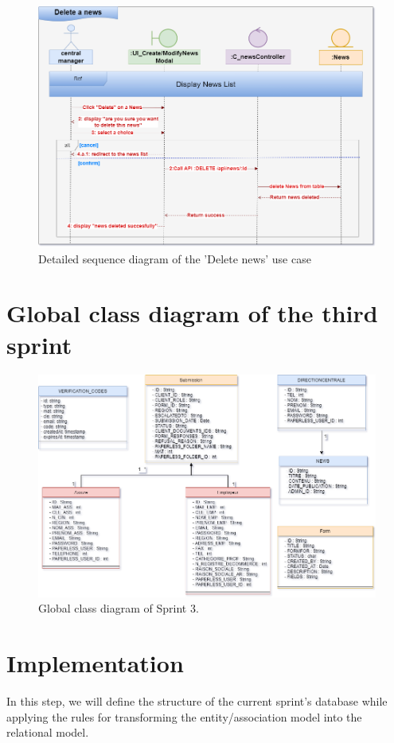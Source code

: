\begin{figure}[h!]
    \centering
    \includegraphics[width=1\textwidth]{figures/det delete a news.png}
    \caption{Detailed sequence diagram of the 'Delete news' use case}
\end{figure}
\clearpage
\section{Global class diagram of the third sprint}
\begin{figure}[h!]
    \centering
    \includegraphics[width=1\textwidth]{figures/global class diagram sprint 3.png}
    \caption{Global class diagram of Sprint 3.}
\end{figure}


\section{Implementation}
In this step, we will define the structure of the current sprint's database while applying the rules for transforming the entity/association model into the relational model.
